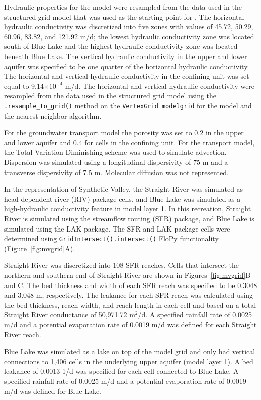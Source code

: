 \documentclass[12pt, oneside]{article}  	%
\begin{document}
Hydraulic properties for the model were resampled from the data used in the structured grid model that was used as the starting point for \cite{hill1998} \citep{pollock2014percomm}. The horizontal hydraulic conductivity was discretized into five zones with values of 45.72, 50.29, 60.96, 83.82, and 121.92 m/d; the lowest hydraulic conductivity zone was located south of Blue Lake and the highest hydraulic conductivity zone was located beneath Blue Lake. The vertical hydraulic conductivity in the upper and lower aquifer was specified to be one quarter of the horizontal hydraulic conductivity. The horizontal and vertical hydraulic conductivity in the confining unit was set equal to 9.14$\times10^{-4}$ m/d. The horizontal and vertical hydraulic conductivity were resampled from the data used in the structured grid model using the \texttt{.resample\_to\_grid()} method on the \texttt{VertexGrid modelgrid} for the model and the nearest neighbor algorithm.

For the groundwater transport model the porosity was set to 0.2 in the upper and lower aquifer and 0.4 for cells in the confining unit. For the transport model, the Total Variation Diminishing scheme was used to simulate advection. Dispersion was simulated using a longitudinal dispersivity of 75 m and a transverse dispersivity of 7.5 m. Molecular diffusion was not represented.

In the \cite{hill1998} representation of Synthetic Valley, the Straight River was simulated as head-dependent river (RIV) package cells, and Blue Lake was simulated as a high-hydraulic conductivity feature in model layer 1. In this recreation, Straight River is simulated using the streamflow routing (SFR) package, and Blue Lake is simulated using the LAK package. The SFR and LAK package cells were determined using \texttt{GridIntersect().intersect()} FloPy functionality (Figure~\ref{fig:mvgrid}A). 

Straight River was discretized into 108 SFR reaches. Cells that intersect the northern and southern end of Straight River are shown in Figures~\ref{fig:mvgrid}B and C. The bed thickness and width of each SFR reach was specified to be 0.3048 and 3.048 m, respectively. The leakance for each SFR reach was calculated using the bed thickness, reach width, and reach length in each cell and based on a total Straight River conductance of 50,971.72 m$^2$/d. A specified rainfall rate of 0.0025 m/d and a potential evaporation rate of 0.0019 m/d was defined for each Straight River reach.

Blue Lake was simulated as a lake on top of the model grid and only had vertical connections to 1,406 cells in the underlying upper aquifer (model layer 1). A bed leakance of 0.0013 1/d was specified for each cell connected to Blue Lake. A specified rainfall rate of 0.0025 m/d and a potential evaporation rate of 0.0019 m/d was defined for Blue Lake.
\end{document}
